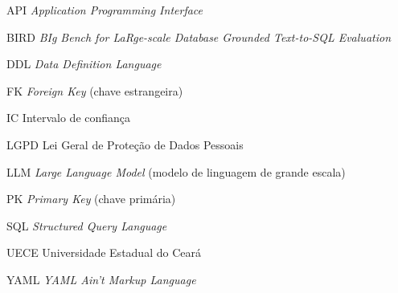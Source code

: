 
\listoffigures*
\cleardoublepage

\listoftables*
\cleardoublepage

\begin{siglas}
  \item[API] \textit{Application Programming Interface}
  \item[BIRD] \textit{BIg Bench for LaRge-scale Database Grounded Text-to-SQL Evaluation}
  \item[DDL] \textit{Data Definition Language}
  \item[FK] \textit{Foreign Key} (chave estrangeira)
  \item[IC] Intervalo de confiança
  \item[LGPD] Lei Geral de Proteção de Dados Pessoais
  \item[LLM] \textit{Large Language Model} (modelo de linguagem de grande escala)
  \item[PK] \textit{Primary Key} (chave primária)
  \item[SQL] \textit{Structured Query Language}
  \item[UECE] Universidade Estadual do Ceará
  \item[YAML] \textit{YAML Ain't Markup Language}
\end{siglas}

\tableofcontents*
\cleardoublepage

